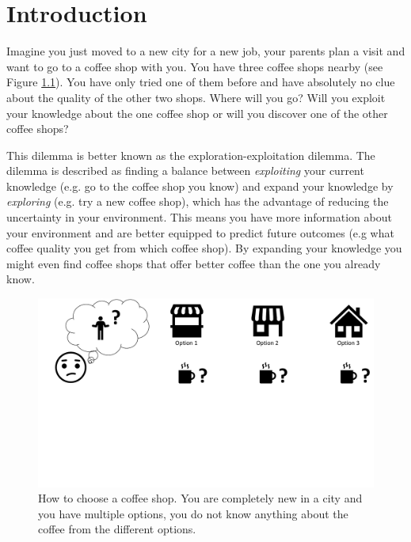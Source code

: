 %
\chapter{Introduction}
Imagine you just moved to a new city for a new job, your parents plan a visit and want to go to a coffee shop with you. You have three coffee shops nearby (see Figure \ref{fig:Coffe_Example}). You have only tried one of them before and have absolutely no clue about the quality of the other two shops. Where will you go? Will you exploit your knowledge about the one coffee shop or will you discover one of the other coffee shops?


This dilemma is better known as the exploration-exploitation dilemma. The dilemma is described as finding a balance between \textit{exploiting} your current knowledge (e.g. go to the coffee shop you know) and expand your knowledge by \textit{exploring} (e.g. try a new coffee shop), which has the advantage of reducing the uncertainty in your environment. This means you have more information about your environment and are better equipped to predict future outcomes (e.g what coffee quality you get from which coffee shop). By expanding your knowledge you might even find coffee shops that offer better coffee than the one you already know.  
\begin{figure}
    \centering
    \includegraphics[width=1\textwidth]{Plots/CoffeExample.pdf}
    \vspace{-4cm}
    \caption[Coffe Shop Example]{How to choose a coffee shop. You are completely new in a city and you have multiple options, you do not know anything about the coffee from the different options.}
    \label{fig:Coffe_Example}
\end{figure}


